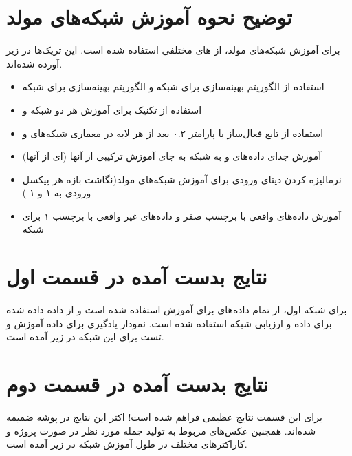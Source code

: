 \documentclass{article}
\begin{document}
\section{توضیح نحوه آموزش شبکه‌های مولد}
برای آموزش ‌شبکه‌های مولد، از ‌های مختلفی استفاده شده است. این تریک‌ها در زیر آورده شده‌اند.  
\begin{itemize}
	\item استفاده از الگوریتم بهینه‌سازی  برای شبکه  و الگوریتم بهینه‌سازی  برای شبکه 
	\item استفاده از تکنیک  برای آموزش هر دو شبکه  و 
	\item استفاده از تابع فعال‌ساز  با پارامتر ۰.۲ بعد از هر لایه در معماری شبکه‌های  و 
	\item آموزش جدای داده‌های و  به شبکه  به جای آموزش ترکیبی از آنها (ای از آنها)
	\item نرمالیزه کردن دیتای ورودی برای آموزش شبکه‌های مولد(نگاشت بازه هر پیکسل  ورودی به ۱ و ۱-)
	\item آموزش داده‌های واقعی با برچسب صفر و داده‌های غیر واقعی با برچسب ۱ برای شبکه  
\end{itemize}

\section{نتایج بدست آمده در قسمت اول}
برای شبکه اول، از تمام داده‌های  برای آموزش استفاده شده است و از داده  داده شده برای داده  و ارزیابی شبکه‌ استفاده شده است. نمودار یادگیری برای داده آموزش و تست برای این شبکه در زیر آمده است.
\section{نتایج بدست آمده در قسمت دوم}
برای این قسمت نتایج عظیمی فراهم شده است! اکثر این نتایج در پوشه‌  ضمیمه شده‌اند. همچنین عکس‌های مربوط به تولید جمله مورد نظر در صورت پروژه و کاراکتر‌های مختلف در طول آموزش شبکه  در زیر آمده است.
\end{document}
